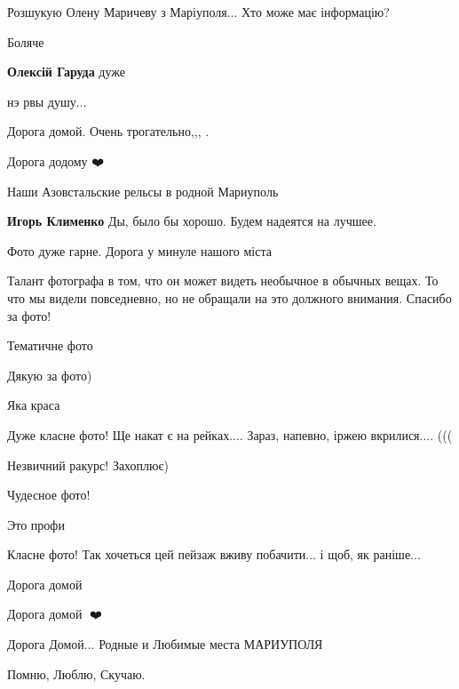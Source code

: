 Розшукую Олену Маричеву з Маріуполя... Хто може має інформацію?


Боляче

\begin{itemize} %
\textbf{Олексій Гаруда} дуже
\end{itemize} %


нэ рвы душу...


Дорога домой. Очень трогательно,,, .


Дорога додому ❤️


Наши Азовстальские рельсы в родной Мариуполь

\begin{itemize} %
\textbf{Игорь Клименко} Ды, было бы хорошо. Будем надеятся на лучшее.
\end{itemize} %


Фото дуже гарне. Дорога у минуле нашого міста


Талант фотографа в том, что он может видеть необычное в обычных вещах. То что мы
видели повседневно, но не обращали на это должного внимания.  Спасибо за фото!


Тематичне фото


Дякую за фото)


Яка краса


Дуже класне фото! Ще накат є на рейках.... Зараз, напевно, іржею вкрилися.... (((


Незвичний ракурс! Захоплює)


Чудесное фото!


Это профи


Класне фото! Так хочеться цей пейзаж вживу побачити... і щоб, як раніше...


Дорога домой


Дорога домой 🙏❤️


Дорога Домой... Родные и Любимые места МАРИУПОЛЯ


Помню, Люблю, Скучаю.
